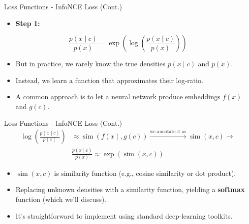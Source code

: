\documentclass[serif, aspectratio=169]{beamer}
\begin{document}
\begin{frame}{Loss Functions - InfoNCE Loss (Cont.)}
    \begin{itemize}
         \item \textbf{Step 1:}
     \end{itemize}

     \begin{equation*}
         \frac{p\left(x \mid c\right)}{p\left(x\right)} =
         \exp\left(\log \left(\frac{p\left(x \mid c\right)}{p\left(x\right)}\right) \right)
     \end{equation*}

     \begin{itemize}
         \item But in practice, we rarely know the true densities $p\left(x \mid c\right)$ and $p\left(x\right)$.
         \item Instead, we learn a function that approximates their log‐ratio.
         \item A common approach is to let a neural network produce embeddings $f\left(x\right)$ and $g\left(c\right)$.
     \end{itemize}
\end{frame}


\begin{frame}{Loss Functions - InfoNCE Loss (Cont.)}
    \begin{equation}
    \begin{split}
        \log \left(\frac{p\left(x \mid c\right)}{p\left(x\right)}\right) &\approx
        \operatorname{sim}\left(f\left(x\right), g\left(c\right) \right)    \xrightarrow{\text{we annotate it as}}
        \operatorname{sim}\left(x, c \right) \xrightarrow{} \\&
        \frac{p\left(x \mid c\right)}{p\left(x\right)} \approx
        \exp\left( \operatorname{sim}\left(x, c \right) \right)
    \end{split}
    \end{equation}

     \begin{itemize}
         \item $\operatorname{sim}\left(x, c \right)$ is similarity function (e.g., cosine similarity or dot product).
         \item Replacing unknown densities with a similarity function, yielding a \textbf{softmax} function (which we'll discuss).
         \item It’s straightforward to implement using standard deep‐learning toolkits.
     \end{itemize}
\end{frame}
\end{document}
